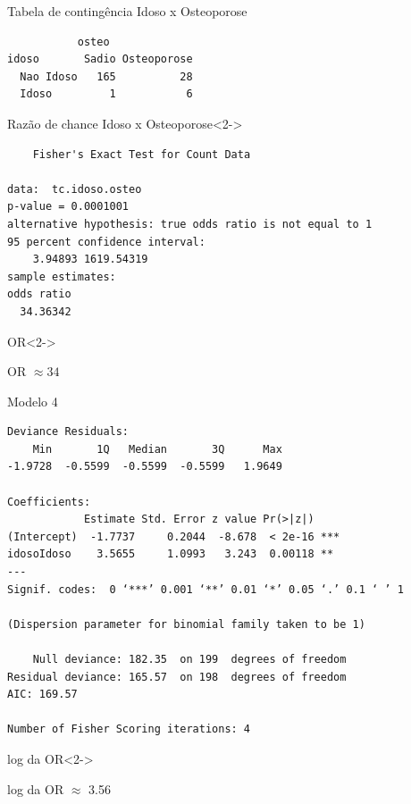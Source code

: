 \documentclass{beamer}
\begin{document}
\begin{frame}[fragile]{}
  \begin{exampleblock}{\small Tabela de contingência Idoso x Osteoporose}
    \tiny
\begin{verbatim}
           osteo
idoso       Sadio Osteoporose
  Nao Idoso   165          28
  Idoso         1           6
\end{verbatim}
  \end{exampleblock}
  \begin{exampleblock}{\small Razão de chance Idoso x Osteoporose}<2->
    \tiny
\begin{verbatim}
	Fisher's Exact Test for Count Data

data:  tc.idoso.osteo
p-value = 0.0001001
alternative hypothesis: true odds ratio is not equal to 1
95 percent confidence interval:
    3.94893 1619.54319
sample estimates:
odds ratio 
  34.36342 
\end{verbatim}
  \end{exampleblock}
  \begin{block}{\small OR}<2->
    \begin{center}
      OR $\approx 34$
    \end{center}
  \end{block}
\end{frame}

\begin{frame}[fragile]{}
  \begin{center}
    \begin{exampleblock}{Modelo 4}
      \tiny
\begin{verbatim}
Deviance Residuals: 
    Min       1Q   Median       3Q      Max  
-1.9728  -0.5599  -0.5599  -0.5599   1.9649  

Coefficients:
            Estimate Std. Error z value Pr(>|z|)    
(Intercept)  -1.7737     0.2044  -8.678  < 2e-16 ***
idosoIdoso    3.5655     1.0993   3.243  0.00118 ** 
---
Signif. codes:  0 ‘***’ 0.001 ‘**’ 0.01 ‘*’ 0.05 ‘.’ 0.1 ‘ ’ 1

(Dispersion parameter for binomial family taken to be 1)

    Null deviance: 182.35  on 199  degrees of freedom
Residual deviance: 165.57  on 198  degrees of freedom
AIC: 169.57

Number of Fisher Scoring iterations: 4
\end{verbatim}
    \end{exampleblock}
    \begin{block}{\small log da OR}<2->
      \begin{center}
        \small
        log da OR $\approx$ 3.56
      \end{center}
    \end{block}
  \end{center}
\end{frame}
\end{document}

